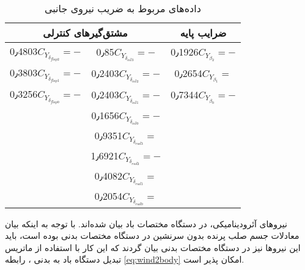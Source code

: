 \begin{table}
	\centering%
	\caption{داده‌های مربوط به ضریب نیروی جانبی}\label{داده‌های مربوط به ضریب نیروی جانبی}
	\begin{tabular}{ |c|c|c| }
		\hline
		\multicolumn{2}{|c|}{مشتق‌گیرهای کنترلی}&ضرایب پایه \\ \hline
		0٫4803$C_{Y_{\delta_{flap2}}}=-$ & 0٫85$C_{Y_{\delta_{ail3}}}=-$ & 0٫1926$C_{Y_{\beta_{2}}}= -$\\
		\hline
		0٫3803$C_{Y_{\delta_{flap1}}}=-$  & 0٫2403$C_{Y_{\delta_{ail2}}}=-$& 0٫2654$C_{Y_{\beta_{1}}}=$\\
		\hline
		0٫3256$C_{Y_{\delta_{flap0}}}=-$ & 0٫2403$C_{Y_{\delta_{ail1}}}=-$ & 0٫7344$C_{Y_{\beta_{0}}}=- $\\
		\hline
		   & 0٫1656$C_{Y_{\delta_{ail0}}}=-$ & \\
		\hline
		 & 0٫9351$C_{Y_{\delta_{rud3}}}=$ & \\
		\hline
		 & 1٫6921$C_{Y_{\delta_{rud2}}}=-$& \\
		\hline
		 & 0٫4082$C_{Y_{\delta_{rud1}}}=$ &\\
		\hline
		 & 0٫2054$C_{Y_{\delta_{rud0}}}=$ & \\
		\hline
	\end{tabular}
\end{table}

نیروهای آئرودینامیکی، در دستگاه مختصات باد بیان شده‌اند.
 با توجه به اینکه  بیان معادلات جسم صلب پرنده بدون سرنشین در دستگاه مختصات بدنی  بوده است، باید این نیروها  نیز در دستگاه مختصات بدنی بیان گردند که این کار با استفاده از ماتریس تبدیل دستگاه باد به بدنی ، رابطه
  \eqref{eq:wind2body}
   امکان پذیر است.
